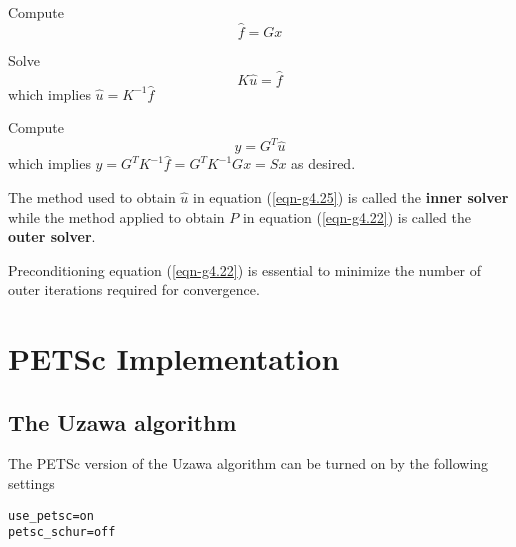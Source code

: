 \documentclass[10pt,letterpaper]{article}
\begin{document}
Compute
\begin{equation}\label{eqn-g4.24}
\hat{f}=Gx
\end{equation}

Solve
\begin{equation}\label{eqn-g4.25}
K\hat{u}=\hat{f}
\end{equation}
which implies $\hat{u}=K^{-1}\hat{f}$

Compute
\begin{equation}\label{eqn-g4.26}
y=G^T\hat{u}
\end{equation}
which implies $y=G^TK^{-1}\hat{f}=G^TK^{-1}Gx=Sx$ as desired.

The method used to obtain $\hat{u}$ in equation (\ref{eqn-g4.25}) is called
the \textbf{inner solver} while the method applied to obtain $P$ in equation
(\ref{eqn-g4.22}) is called the \textbf{outer solver}.

Preconditioning equation (\ref{eqn-g4.22}) is essential to minimize the number
of outer iterations required for convergence.

\section{PETSc Implementation}
\subsection{The Uzawa algorithm}
The PETSc version of the Uzawa algorithm can be turned on by the following settings
\begin{lstlisting}
use_petsc=on
petsc_schur=off
\end{lstlisting}
\end{document}
